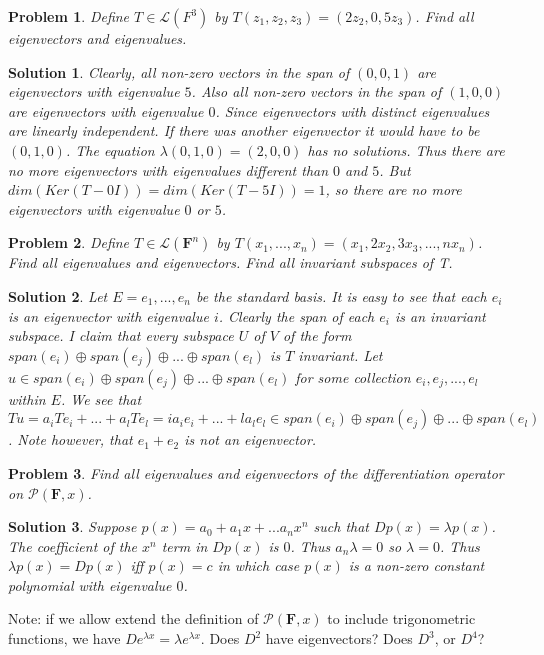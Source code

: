 \documentclass{article}
\theoremstyle{problemstyle}
\newtheorem{problem}{Problem}
\theoremstyle{problemstyle}
\newtheorem{solution}{Solution}
\begin{document}
\begin{problem}
Define $T \in \mathscr{L}(F^3)$ by $T(z_1,z_2,z_3) = (2z_2,0,5z_3)$. Find all eigenvectors and eigenvalues. 
\end{problem}
\begin{solution}
Clearly, all non-zero vectors in the span of $(0,0,1)$ are eigenvectors with eigenvalue $5$. Also all non-zero vectors in the span of $(1,0,0)$ are eigenvectors with eigenvalue $0$. Since eigenvectors with distinct eigenvalues are linearly independent. If there was another eigenvector it would have to be $(0,1,0)$. The equation $\lambda(0,1,0) = (2,0,0)$ has no solutions. Thus there are no more eigenvectors with eigenvalues different than $0$ and $5$. But $dim(Ker(T-0I)) = dim(Ker(T-5I)) = 1$, so there are no more eigenvectors with eigenvalue $0$ or $5$. 
\end{solution}

\begin{problem}
Define $T \in \mathscr{L}(\textbf{F}^n)$ by $T(x_1,...,x_n) = (x_1,2x_2,3x_3,...,nx_n)$. Find all eigenvalues and eigenvectors.  Find all invariant subspaces of T. 
\end{problem}

\begin{solution}
Let $E = e_1,...,e_n$ be the standard basis. It is easy to see that each $e_i$ is an eigenvector with eigenvalue $i$. Clearly the span of each $e_i$ is an invariant subspace. 
I claim that every subspace $U$ of $V$ of the form $span(e_i)\oplus span(e_j) \oplus ... \oplus span(e_l)$ is $T$ invariant. Let $u \in span(e_i)\oplus span(e_j) \oplus ... \oplus span(e_l)$ for some collection $e_i,e_j,...,e_l$ within $E$. We see that $Tu = a_iTe_i+...+a_lTe_l = ia_ie_i + ...+la_le_l \in span(e_i)\oplus span(e_j) \oplus ... \oplus span(e_l)$. Note however, that $e_1+e_2$ is not an eigenvector.
\end{solution}

\begin{problem}
Find all eigenvalues and eigenvectors of the differentiation operator on $\mathcal{P}(\textbf{F},x)$. 
\end{problem}

\begin{solution}
Suppose $p(x) = a_0+a_1x+...a_nx^n$ such that $Dp(x) = \lambda p(x)$. The coefficient of the $x^n$ term in $Dp(x)$ is $0$. Thus $a_n\lambda = 0$ so $\lambda = 0$.  Thus $\lambda p(x) = Dp(x)$ iff $p(x) = c$ in which case $p(x)$ is a non-zero constant polynomial with eigenvalue $0$. 
\end{solution}

Note: if we allow extend the definition of $\mathcal{P}(\textbf{F},x)$ to include trigonometric functions, we have  $De^{\lambda x} = \lambda e^{\lambda x}$. Does $D^2$ have eigenvectors? Does $D^3$, or $D^4$?
\end{document}

